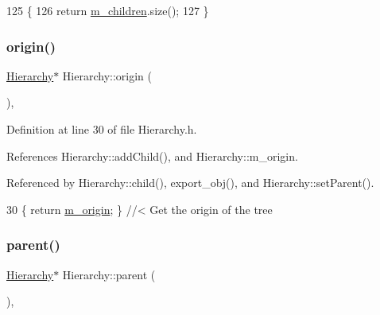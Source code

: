 \begin{DoxyCode}
125                                            \{
126   \textcolor{keywordflow}{return} \hyperlink{classHierarchy_a038816763941fd4a930504917f60483b}{m\_children}.size();
127 \}
\end{DoxyCode}
\mbox{\label{classHierarchy_aee461dc930ce3871636ff87f075b1b83}} 
\subsubsection{\texorpdfstring{origin()}{origin()}}
{\footnotesize\ttfamily \hyperlink{classHierarchy}{Hierarchy}$\ast$ Hierarchy\+::origin (\begin{DoxyParamCaption}{ }\end{DoxyParamCaption})\hspace{0.3cm}{\ttfamily [inline]}, {\ttfamily [inherited]}}



Definition at line 30 of file Hierarchy.\+h.



References Hierarchy\+::add\+Child(), and Hierarchy\+::m\+\_\+origin.



Referenced by Hierarchy\+::child(), export\+\_\+obj(), and Hierarchy\+::set\+Parent().


\begin{DoxyCode}
30 \{ \textcolor{keywordflow}{return} \hyperlink{classHierarchy_a16c73e557d3a7c156ffb5dc4102d148e}{m\_origin}; \}  \textcolor{comment}{//< Get the origin of the tree}
\end{DoxyCode}
\mbox{\label{classHierarchy_a1c7bec8257e717f9c1465e06ebf845fc}} 
\subsubsection{\texorpdfstring{parent()}{parent()}\hspace{0.1cm}{\footnotesize\ttfamily [1/2]}}
{\footnotesize\ttfamily \hyperlink{classHierarchy}{Hierarchy}$\ast$ Hierarchy\+::parent (\begin{DoxyParamCaption}{ }\end{DoxyParamCaption})\hspace{0.3cm}{\ttfamily [inline]}, {\ttfamily [inherited]}}



